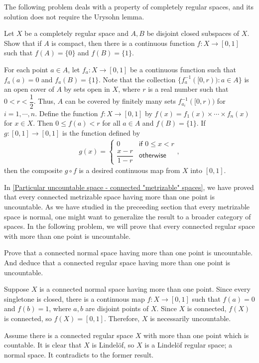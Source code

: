 The following problem deals with a property of completely regular spaces, and its solution does not require the Urysohn lemma.
\begin{prob}
    Let $X$ be a completely regular space and $A, B$ be disjoint closed subspaces of $X$.
    Show that if $A$ is compact, then there is a continuous function $f: X\rightarrow[0, 1]$ such that $f(A)=\{0\}$ and $f(B)=\{1\}$.
\end{prob}
\begin{sol}
    For each point $a\in A$, let $f_a: X\rightarrow[0, 1]$ be a continuous function such that $f_a(a)=0$ and $f_a(B)=\{1\}$.
    Note that the collection $\{f_a^{-1}([0, r)):a\in A\}$ is an open cover of $A$ by sets open in $X$, where $r$ is a real number such that $0<r<\dfrac{1}{2}$.
    Thus, $A$ can be covered by finitely many sets $f_{a_i}^{-1}([0, r))$ for $i=1, \cdots, n$.
    Define the function $f: X\rightarrow[0, 1]$ by $f(x)=f_1(x)\times\cdots\times f_n(x)$ for $x\in X$.
    Then $0\leq f(a)<r$ for all $a\in A$ and $f(B)=\{1\}$.
    If $g:[0, 1]\rightarrow[0, 1]$ is the function defined by
    \begin{eqnarray*}
        g(x)=\left\{
        \begin{matrix}
            0 & \textsf{if }0\leq x<r\\
            \dfrac{x-r}{1-r} & \textsf{otherwise}
        \end{matrix}\right.,
    \end{eqnarray*}
    then the composite $g\circ f$ is a desired continuous map from $X$ into $[0, 1]$.
\end{sol}

In \cref{Particular uncountable space - connected "metrizable" spaces}, we have proved that every connected metrizable space having more than one point is uncountable.
As we have studied in the preceeding section that every metrizable space is normal, one might want to generalize the result to a broader category of spaces.
In the following problem, we will prove that every connected regular space with more than one point is uncountable.
\begin{prob}\label{nontrivial connected regular spaces are uncountable}
    Prove that a connected normal space having more than one point is uncountable.
    And deduce that a connected regular space having more than one point is uncountable.
\end{prob}
\begin{sol}
    Suppose $X$ is a connected normal space having more than one point.
    Since every singletone is closed, there is a continuous map $f: X\rightarrow[0, 1]$ such that $f(a)=0$ and $f(b)=1$, where $a, b$ are disjoint points of $X$.
    Since $X$ is connected, $f(X)$ is connected, so $f(X)=[0, 1]$.
    Therefore, $X$ is necessarily uncountable.
            
    Assume there is a connected regular space $X$ with more than one point which is countable.
    It is clear that $X$ is Lindel\"{o}f, so $X$ is a Lindel\"{o}f regular space; a normal space.
    It contradicts to the former result.
\end{sol}